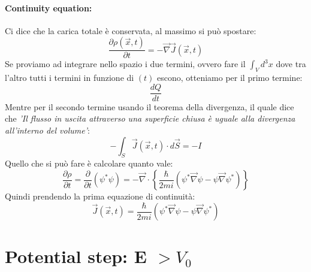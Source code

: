 \paragraph{Continuity equation:}
Ci dice che la carica totale è conservata, al massimo si può spostare:
$$\frac{\partial \rho (\vec{x}, t)}{\partial t} = -\vec{\nabla}\vec{J}(\vec{x}, t)$$
Se proviamo ad integrare nello spazio i due termini, ovvero fare il
$\int_{V}d^3x$
dove tra l'altro tutti i termini in funzione di $(t)$ escono, otteniamo per il primo termine:
$$\frac{dQ}{dt}$$
Mentre per il secondo termine usando il teorema della divergenza, il quale dice che \textit{'Il flusso in uscita attraverso una superficie chiusa è uguale alla divergenza all'interno del volume'}:
$$-\int_{S}\vec{J}(\vec{x}, t) \cdot d\vec{S} = -I$$
Quello che si può fare è calcolare quanto vale:
$$\frac{\partial \rho}{\partial t} = \frac{\partial}{\partial t}(\psi^*\psi) = -\vec{\nabla} \cdot \left\{ \frac{\hbar}{2mi} \left( \psi^*\vec{\nabla}\psi - \psi\vec{\nabla}\psi^* \right)\right\}$$
Quindi prendendo la prima equazione di continuità:
$$\vec{J}(\vec{x}, t) = \frac{\hbar}{2mi}\left( \psi^*\vec{\nabla}\psi - \psi\vec{\nabla}\psi^* \right)$$

\section{Potential step: E $> V_0$}

